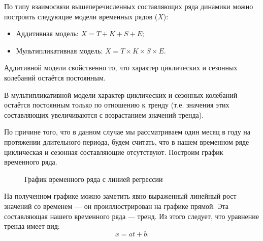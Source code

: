 По типу взаимосвязи вышеперечисленных составляющих ряда динамики можно построить следующие модели временных рядов ($X$):

\begin{itemize}
	\item Аддитивная модель: $X = T + K + S + E$;
	\item Мультипликативная модель: $X = T \times K \times S \times E$.
\end{itemize}
Аддитивной модели свойственно то, что характер циклических и сезонных колебаний остаётся постоянным.

В мультипликативной модели характер циклических и сезонных колебаний остаётся постоянным только по отношению к тренду (т.е. значения этих составляющих увеличиваются с возрастанием значений тренда).

По причине того, что в данном случае мы рассматриваем один месяц в году на протяжении длительного периода, будем считать, что в нашем временном ряде циклическая и сезонная составляющие отсутствуют. Построим график временного ряда.

\begin{figure}[ht]
\caption{График временного ряда с линией регрессии}
\label{img:ts_regr}
\end{figure}

На полученном графике можно заметить явно выраженный линейный рост значений со временем --- он проиллюстрирован на графике прямой. Эта составляющая нашего временного ряда --- тренд. Из этого следует, что уравнение тренда имеет вид:
\begin{equation*}
	x = at + b.
\end{equation*}


